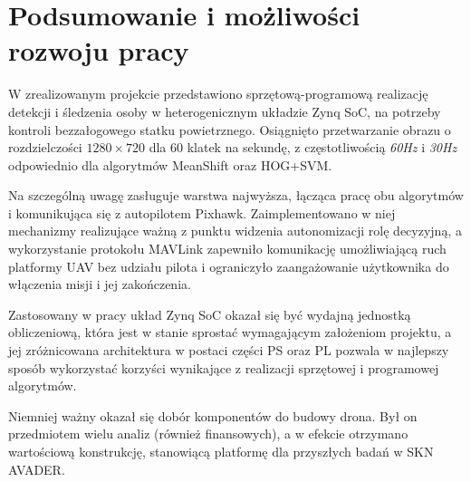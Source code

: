 \chapter{Podsumowanie i możliwości rozwoju pracy}

W zrealizowanym projekcie przedstawiono sprzętową-programową realizację detekcji i śledzenia osoby w heterogenicznym układzie Zynq SoC, na potrzeby kontroli bezzałogowego statku powietrznego. 
Osiągnięto przetwarzanie obrazu o rozdzielczości $1280\times 720$ dla 60 klatek na sekundę, z częstotliwością \textit{60Hz} i \textit{30Hz} odpowiednio dla algorytmów MeanShift oraz HOG+SVM.

Na szczególną uwagę zasługuje warstwa najwyższa, łącząca pracę obu algorytmów i komunikująca się z autopilotem Pixhawk. Zaimplementowano w niej mechanizmy realizujące ważną z punktu widzenia autonomizacji rolę decyzyjną, a wykorzystanie protokołu MAVLink zapewniło komunikację umożliwiającą ruch platformy UAV bez udziału pilota i ograniczyło zaangażowanie użytkownika do włączenia misji i jej zakończenia.

Zastosowany w pracy układ Zynq SoC okazał się być wydajną jednostką obliczeniową, która jest w stanie sprostać wymagającym założeniom projektu, a jej zróżnicowana architektura w postaci części PS oraz PL pozwala w najlepszy sposób wykorzystać korzyści wynikające z realizacji sprzętowej i programowej algorytmów.

Niemniej ważny okazał się dobór komponentów do budowy drona. Był on przedmiotem wielu analiz (również finansowych), a w efekcie otrzymano wartościową konstrukcję, stanowiącą platformę dla przyszłych badań w SKN AVADER.




